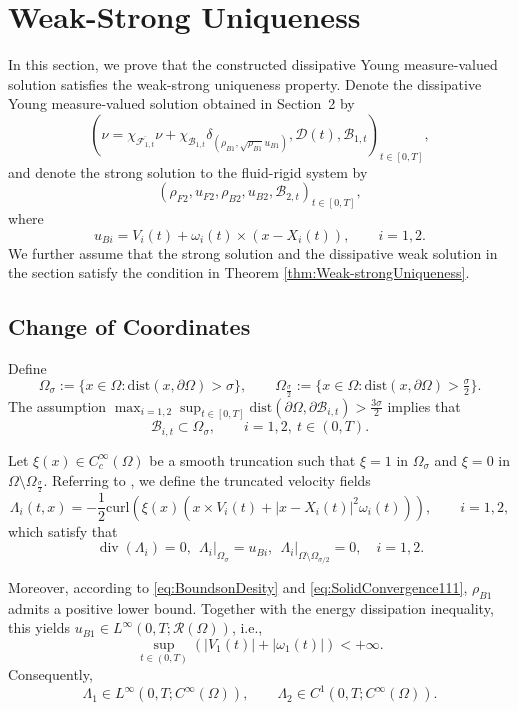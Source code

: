 \documentclass[11pt,twoside,reqno]{amsart}
\numberwithin{equation}{section}
\numberwithin{figure}{section}
\begin{document}
\section{Weak-Strong Uniqueness}

In this section, we prove that the constructed dissipative Young measure-valued solution satisfies the weak-strong uniqueness property.  
Denote the dissipative Young measure-valued solution obtained in Section~2 by
\[
(\nu=\chi_{\overline{\mathcal{F}_{1,t}}}\nu
   +\chi_{\mathcal{B}_{1,t}}\delta_{(\rho_{B1},\sqrt{\rho_{B1}}u_{B1})},
   \mathcal{D}(t), \mathcal{B}_{1,t})_{t\in[0,T]},
\]
and denote the strong solution to the fluid-rigid system by
\[
(\rho_{F2},u_{F2},\rho_{B2},u_{B2},\mathcal{B}_{2,t})_{t\in[0,T]},
\]
where
\begin{equation}
    u_{B i}=V_i(t)+\omega_i(t)\times(x-X_i(t)),\qquad i=1,2.
\end{equation}
We further assume that the strong solution and the dissipative weak solution in the section satisfy the condition in Theorem \ref{thm:Weak-strongUniqueness}.


\subsection{Change of Coordinates}

Define
\[
\Omega_\sigma:=\{x\in\Omega:\mathrm{dist}(x,\partial\Omega)>\sigma\},\qquad
\Omega_{\frac{\sigma}{2}}:=\{x\in\Omega:\mathrm{dist}(x,\partial\Omega)>\tfrac{\sigma}{2}\}.
\]
The assumption $\max_{i=1,2}\sup_{t\in[0,T]}
  \mathrm{dist}(\partial\Omega,\partial\mathcal{B}_{i,t})
  >\frac{3\sigma}{2}$ implies that
\[
\mathcal{B}_{i,t}\subset\Omega_\sigma,\qquad i=1,2,\ t\in(0,T).
\]

Let $\xi(x)\in C_c^\infty(\Omega)$ be a smooth truncation such that $\xi=1$ in $\Omega_\sigma$ and $\xi=0$ in $\Omega\setminus\Omega_{\frac{\sigma}{2}}$. Referring to \cite[Lemma 1]{MR2888201}, we define the truncated velocity fields
\begin{equation}
    \Lambda_i(t,x)=-\frac{1}{2}\text{curl}(\xi(x)(x\times V_i(t)+|x-X_i(t)|^2\omega_i(t))),\qquad i=1,2,
\end{equation}
which satisfy that 
\begin{equation}
    \operatorname{div}(\Lambda_i)=0, ~~ \Lambda_i\big|_{\Omega_\sigma}=u_{Bi}, ~~ \Lambda_i\big|_{\Omega\setminus\Omega_{{\sigma}/{2}}}=0, \quad i=1,2. 
\end{equation}


Moreover, according to \eqref{eq:BoundsonDesity} and \eqref{eq:SolidConvergence111}, $\rho_{B1}$ admits a positive lower bound.  
Together with the energy dissipation inequality, this yields $u_{B1}\in L^\infty(0,T;\mathcal{R}(\Omega))$, i.e.,
\[
\sup_{t\in(0,T)}(|V_1(t)|+|\omega_1(t)|)<+\infty.
\]
Consequently,
\begin{equation}
    \Lambda_1\in L^\infty(0,T;C^\infty(\Omega)),\qquad
    \Lambda_2\in C^1(0,T;C^\infty(\Omega)).
\end{equation}
\end{document}

